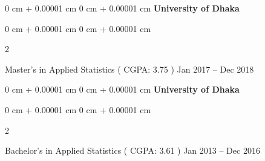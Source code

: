 \documentclass[10pt, letterpaper]{article}
\newenvironment{highlights}{
    \begin{itemize}[
        topsep=0.10 cm,
        parsep=0.10 cm,
        partopsep=0pt,
        itemsep=0pt,
        leftmargin=0 cm + 10pt
    ]
}{
    \end{itemize}
} %
\newenvironment{onecolentry}{
    \begin{adjustwidth}{
        0 cm + 0.00001 cm
    }{
        0 cm + 0.00001 cm
    }
}{
    \end{adjustwidth}
} %
\newenvironment{twocolentry}[2][]{
    \onecolentry
    \def\secondColumn{#2}
    \setcolumnwidth{\fill, 4.5 cm}
    \begin{paracol}{2}
}{
    \switchcolumn \raggedleft \secondColumn
    \end{paracol}
    \endonecolentry
} %
\begin{document}
               

    \vspace{0.20 cm}
    \begin{onecolentry}{
    \textbf{University of Dhaka}
    }
    \end{onecolentry}
    \begin{twocolentry}{
            Jan 2017 – Dec 2018
        }
         Master's in Applied Statistics ( CGPA: 3.75 )\end{twocolentry}
        \vspace{0.10 cm}


            \vspace{0.20 cm}
     \begin{onecolentry}{
    \textbf{University of Dhaka}
    }
    \end{onecolentry}        
    \begin{twocolentry}{
            Jan 2013 – Dec 2016
        }
            Bachelor's in Applied Statistics ( CGPA: 3.61 )\end{twocolentry}
        \vspace{0.10 cm}
\end{document}
